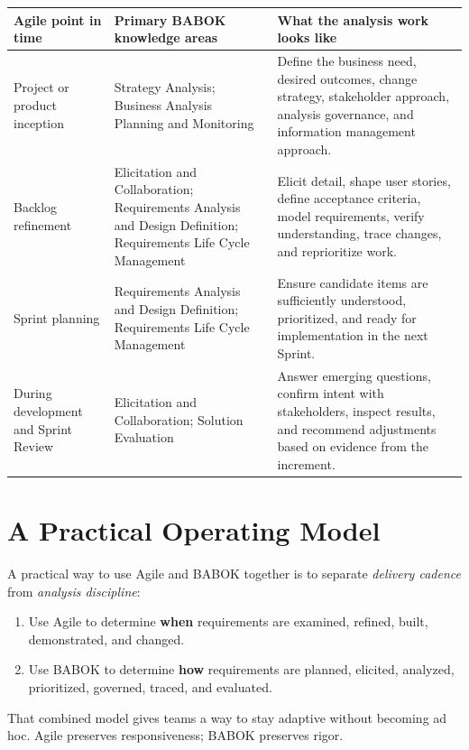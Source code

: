 \documentclass[11pt]{article}
\begin{document}
\renewcommand{\arraystretch}{1.25}
\begin{tabularx}{\textwidth}{>{\raggedright\arraybackslash}p{} >{\raggedright\arraybackslash}p{} >{\raggedright\arraybackslash}X}
\toprule
\textbf{Agile point in time} & \textbf{Primary BABOK knowledge areas} & \textbf{What the analysis work looks like} \\
\midrule
Project or product inception & Strategy Analysis; Business Analysis Planning and Monitoring & Define the business need, desired outcomes, change strategy, stakeholder approach, analysis governance, and information management approach. \\
\addlinespace
Backlog refinement & Elicitation and Collaboration; Requirements Analysis and Design Definition; Requirements Life Cycle Management & Elicit detail, shape user stories, define acceptance criteria, model requirements, verify understanding, trace changes, and reprioritize work. \\
\addlinespace
Sprint planning & Requirements Analysis and Design Definition; Requirements Life Cycle Management & Ensure candidate items are sufficiently understood, prioritized, and ready for implementation in the next Sprint. \\
\addlinespace
During development and Sprint Review & Elicitation and Collaboration; Solution Evaluation & Answer emerging questions, confirm intent with stakeholders, inspect results, and recommend adjustments based on evidence from the increment. \\
\bottomrule
\end{tabularx}

\section{A Practical Operating Model}

A practical way to use Agile and BABOK together is to separate \emph{delivery cadence} from \emph{analysis discipline}:

\begin{enumerate}
  \item Use Agile to determine \textbf{when} requirements are examined, refined, built, demonstrated, and changed.
  \item Use BABOK to determine \textbf{how} requirements are planned, elicited, analyzed, prioritized, governed, traced, and evaluated.
\end{enumerate}

That combined model gives teams a way to stay adaptive without becoming ad hoc. Agile preserves responsiveness; BABOK preserves rigor.
\end{document}
